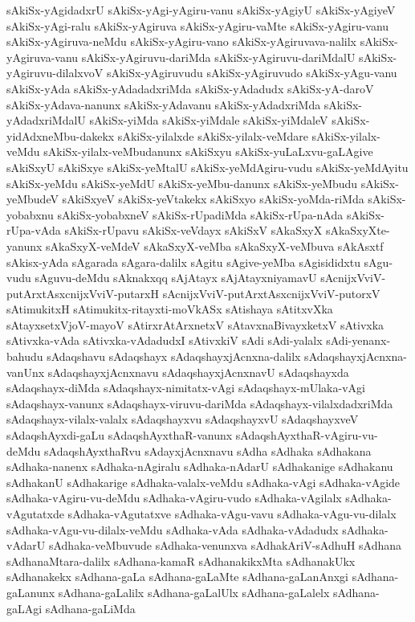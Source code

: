 {sAkiSx-yAgidadxrU
sAkiSx-yAgi-yAgiru-vanu
sAkiSx-yAgiyU
sAkiSx-yAgiyeV
sAkiSx-yAgi-ralu
sAkiSx-yAgiruva
sAkiSx-yAgiru-vaMte
sAkiSx-yAgiru-vanu
sAkiSx-yAgiruva-neMdu
sAkiSx-yAgiru-vano
sAkiSx-yAgiruvava-nalilx
sAkiSx-yAgiruva-vanu
sAkiSx-yAgiruvu-dariMda
sAkiSx-yAgiruvu-dariMdalU
sAkiSx-yAgiruvu-dilalxvoV
sAkiSx-yAgiruvudu
sAkiSx-yAgiruvudo
sAkiSx-yAgu-vanu
sAkiSx-yAda
sAkiSx-yAdadadxriMda
sAkiSx-yAdadudx
sAkiSx-yA-daroV
sAkiSx-yAdava-nanunx
sAkiSx-yAdavanu
sAkiSx-yAdadxriMda
sAkiSx-yAdadxriMdalU
sAkiSx-yiMda
sAkiSx-yiMdale
sAkiSx-yiMdaleV
sAkiSx-yidAdxneMbu-dakekx
sAkiSx-yilalxde
sAkiSx-yilalx-veMdare
sAkiSx-yilalx-veMdu
sAkiSx-yilalx-veMbudanunx
sAkiSxyu
sAkiSx-yuLaLxvu-gaLAgive
sAkiSxyU
sAkiSxye
sAkiSx-yeMtalU
sAkiSx-yeMdAgiru-vudu
sAkiSx-yeMdAyitu
sAkiSx-yeMdu
sAkiSx-yeMdU
sAkiSx-yeMbu-danunx
sAkiSx-yeMbudu
sAkiSx-yeMbudeV
sAkiSxyeV
sAkiSx-yeVtakekx
sAkiSxyo
sAkiSx-yoMda-riMda
sAkiSx-yobabxnu
sAkiSx-yobabxneV
sAkiSx-rUpadiMda
sAkiSx-rUpa-nAda
sAkiSx-rUpa-vAda
sAkiSx-rUpavu
sAkiSx-veVdayx
sAkiSxV
sAkaSxyX
sAkaSxyXte-yanunx
sAkaSxyX-veMdeV
sAkaSxyX-veMba
sAkaSxyX-veMbuva
sAkAsxtf
sAkisx-yAda
sAgarada
sAgara-dalilx
sAgitu
sAgive-yeMba
sAgisididxtu
sAgu-vudu
sAguvu-deMdu
sAknakxqq
sAjAtayx
sAjAtayxniyamavU
sAcnijxVviV-putArxtAsxcnijxVviV-putarxH
sAcnijxVviV-putArxtAsxcnijxVviV-putorxV
sAtimukitxH
sAtimukitx-ritayxti-moVkASx
sAtishaya
sAtitxvXka
sAtayxsetxVjoV-mayoV
sAtirxrAtArxnetxV
sAtavxnaBivayxketxV
sAtivxka
sAtivxka-vAda
sAtivxka-vAdadudxI
sAtivxkiV
sAdi
sAdi-yalalx
sAdi-yenanx-bahudu
sAdaqshavu
sAdaqshayx
sAdaqshayxjAcnxna-dalilx
sAdaqshayxjAcnxna-vanUnx
sAdaqshayxjAcnxnavu
sAdaqshayxjAcnxnavU
sAdaqshayxda
sAdaqshayx-diMda
sAdaqshayx-nimitatx-vAgi
sAdaqshayx-mUlaka-vAgi
sAdaqshayx-vanunx
sAdaqshayx-viruvu-dariMda
sAdaqshayx-vilalxdadxriMda
sAdaqshayx-vilalx-valalx
sAdaqshayxvu
sAdaqshayxvU
sAdaqshayxveV
sAdaqshAyxdi-gaLu
sAdaqshAyxthaR-vanunx
sAdaqshAyxthaR-vAgiru-vu-deMdu
sAdaqshAyxthaRvu
sAdayxjAcnxnavu
sAdha
sAdhaka
sAdhakana
sAdhaka-nanenx
sAdhaka-nAgiralu
sAdhaka-nAdarU
sAdhakanige
sAdhakanu
sAdhakanU
sAdhakarige
sAdhaka-valalx-veMdu
sAdhaka-vAgi
sAdhaka-vAgide
sAdhaka-vAgiru-vu-deMdu
sAdhaka-vAgiru-vudo
sAdhaka-vAgilalx
sAdhaka-vAgutatxde
sAdhaka-vAgutatxve
sAdhaka-vAgu-vavu
sAdhaka-vAgu-vu-dilalx
sAdhaka-vAgu-vu-dilalx-veMdu
sAdhaka-vAda
sAdhaka-vAdadudx
sAdhaka-vAdarU
sAdhaka-veMbuvude
sAdhaka-venunxva
sAdhakAriV-sAdhuH
sAdhana
sAdhanaMtara-dalilx
sAdhana-kamaR
sAdhanakikxMta
sAdhanakUkx
sAdhanakekx
sAdhana-gaLa
sAdhana-gaLaMte
sAdhana-gaLanAnxgi
sAdhana-gaLanunx
sAdhana-gaLalilx
sAdhana-gaLalUlx
sAdhana-gaLalelx
sAdhana-gaLAgi
sAdhana-gaLiMda
}
